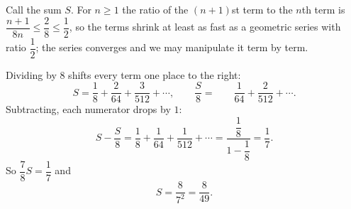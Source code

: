 Call the sum $S$. For $n\ge1$ the ratio of the $(n+1)$st term to the $n$th term is $\dfrac{n+1}{8n}\le\dfrac{2}{8}\le\dfrac{1}{2}$, so the terms shrink at least as fast as a geometric series with ratio $\dfrac{1}{2}$; the series converges and we may manipulate it term by term.

Dividing by $8$ shifts every term one place to the right:
\[S=\dfrac{1}{8}+\dfrac{2}{64}+\dfrac{3}{512}+\cdots,\qquad \dfrac{S}{8}=\phantom{\dfrac{1}{8}+{}}\dfrac{1}{64}+\dfrac{2}{512}+\cdots.\]
Subtracting, each numerator drops by $1$:
\[S-\dfrac{S}{8}=\dfrac{1}{8}+\dfrac{1}{64}+\dfrac{1}{512}+\cdots=\dfrac{\dfrac{1}{8}}{1-\dfrac{1}{8}}=\dfrac{1}{7}.\]
So $\dfrac{7}{8}S=\dfrac{1}{7}$ and
\[S=\dfrac{8}{7^2}=\boxed{\dfrac{8}{49}}.\]
